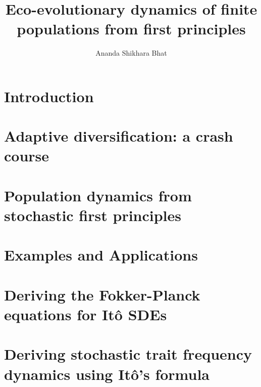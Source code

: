 \documentclass[twoside, 12pt]{iiser-thesis}
\title{Eco-evolutionary dynamics of finite populations from first principles}
\author{Ananda Shikhara Bhat}
\begin{document}
\thesisfront
\listoftables
\listoffigures	
\chapter{Introduction}

\chapter{Adaptive diversification: a crash course}\label{chap_AD}

\chapter{Population dynamics from stochastic first principles}\label{chap_BD}

\chapter{Examples and Applications}\label{chap_examples}

% 
% 

\begin{appendices}
\chapter{Deriving the Fokker-Planck equations for It\^{o} SDEs}\label{App_SDE_FPE}

\chapter{Deriving stochastic trait frequency dynamics using It\^{o}'s formula}\label{App_density_to_freq}

\end{appendices}

\printbibliography[title=References]
\end{document}
